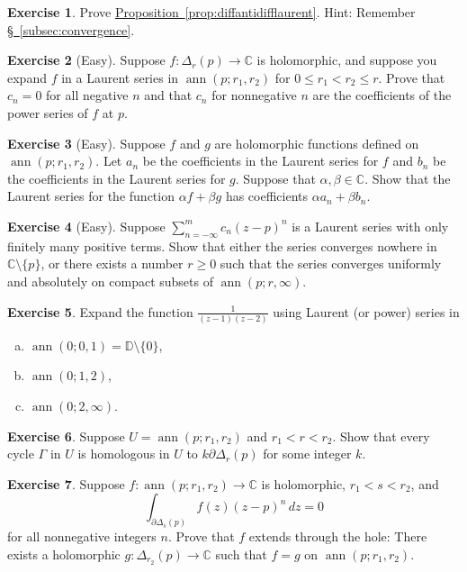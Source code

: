\documentclass[12pt,openany]{book}
\newcommand{\ann}{\operatorname{ann}}
\newcommand{\C}{{\mathbb{C}}}
\newcommand{\D}{{\mathbb{D}}}
\theoremstyle{plain}
\theoremstyle{remark}
\theoremstyle{definition}
\newenvironment{exbox}{%
    \def\FrameCommand{\vrule width 1pt \relax\hspace{10pt}}%
    \MakeFramed{\advance\hsize-\width\FrameRestore}%
}{%
    \endMakeFramed
}
\newenvironment{exparts}{%
    \leavevmode\begin{enumerate}[a),noitemsep,topsep=0pt,parsep=0pt,partopsep=0pt]
}{%
    \end{enumerate}
}
\theoremstyle{exercise}
\newtheorem{exercise}{Exercise}[section]
\theoremstyle{example}
\newcommand{\subsectionref}[1]{\hyperref[#1]{\S~\ref*{#1}}}
\newcommand{\propref}[1]{\hyperref[#1]{Proposition~\ref*{#1}}}
\begin{document}
\begin{exbox}
\begin{exercise}
Prove \propref{prop:diffantidifflaurent}.
Hint: Remember \subsectionref{subsec:convergence}.
\end{exercise}

\begin{exercise}[Easy]
Suppose $f \colon \Delta_r(p) \to \C$ is holomorphic, and suppose you expand
$f$ in a Laurent series in $\ann(p;r_1,r_2)$ for $0 \leq r_1 < r_2 \leq r$.
Prove that $c_n = 0$ for all negative $n$ and that $c_n$ for nonnegative $n$
are the coefficients of the power series of $f$ at $p$.
\end{exercise}

\begin{exercise}[Easy]
Suppose $f$ and $g$ are holomorphic functions defined on
$\ann(p;r_1,r_2)$.  Let $a_n$ be the coefficients in the Laurent series for
$f$ and $b_n$ be the coefficients in the Laurent series for $g$.  Suppose
that $\alpha,\beta \in \C$.  Show that the Laurent series for the function
$\alpha f + \beta g$ has coefficients $\alpha a_n + \beta b_n$.
\end{exercise}

\begin{exercise}[Easy]
Suppose $\sum_{n=-\infty}^m c_n {(z-p)}^n$ is a Laurent series with only
finitely many positive terms.  Show that either the series converges
nowhere in $\C \setminus \{ p \}$, or there exists a number $r \geq 0$ such that the series
converges uniformly and absolutely on compact subsets of
$\ann(p;r,\infty)$.
\end{exercise}

\begin{exercise}
Expand the function $\frac{1}{(z-1)(z-2)}$ using Laurent (or power) series in 
\begin{exparts}
\item $\ann(0;0,1) = \D \setminus \{ 0 \}$,
\item $\ann(0;1,2)$,
\item $\ann(0;2,\infty)$.
\end{exparts}
\end{exercise}

\begin{exercise}
Suppose $U = \ann(p;r_1,r_2)$ and $r_1 < r < r_2$.
Show that every cycle $\Gamma$ in $U$ is homologous in $U$
to $k \partial \Delta_r(p)$ for some integer $k$.
\end{exercise}

\begin{exercise}
Suppose $f \colon \ann(p;r_1,r_2) \to \C$ is holomorphic,
$r_1 < s < r_2$, and
\begin{equation*}
\int_{\partial \Delta_{s}(p)} f(z){(z-p)}^n
 \, dz = 0
\end{equation*}
for all nonnegative integers $n$.  Prove that $f$ extends through the hole:
There exists a holomorphic $g \colon \Delta_{r_2}(p) \to \C$ such that 
$f = g$ on $\ann(p;r_1,r_2)$.
\end{exercise}


\end{exbox}
\end{document}
